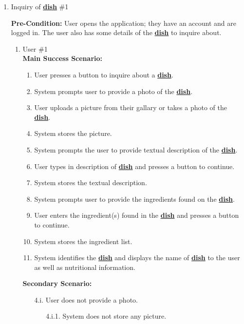 \documentclass[]{article}
\begin{document}
\begin{enumerate}[{\bf BE1.}]
	\item Inquiry of \hyperref[Dish]{\textbf{dish}} \#1
	
	\textbf{Pre-Condition:} User opens the application; they have an account and are logged in. The user also has some details of the \hyperref[Dish]{\textbf{dish}} to inquire about.
		\begin{enumerate}[{\bf VP1.}]
			\item User \#1 \\
				\textbf{Main Success Scenario:} 
				\begin{enumerate}[{1.}]
					\item User presses a button to inquire about a \hyperref[Dish]{\textbf{dish}}.
					\item System prompts user to provide a photo of the \hyperref[Dish]{\textbf{dish}}.
					\item User uploads a picture from their gallary or takes a photo of the \hyperref[Dish]{\textbf{dish}}.
					\item System stores the picture.
					\item System prompts the user to provide textual description of the \hyperref[Dish]{\textbf{dish}}.
					\item User types in description of \hyperref[Dish]{\textbf{dish}} and presses a button to continue.
					\item System stores the textual description.
					\item System prompts user to provide the ingredients found on the \hyperref[Dish]{\textbf{dish}}.
					\item User enters the ingredient(s) found in the \hyperref[Dish]{\textbf{dish}} and presses a button to continue.
					\item System stores the ingredient list.
					\item System identifies the \hyperref[Dish]{\textbf{dish}} and displays the name of \hyperref[Dish]{\textbf{dish}} to the user as well as nutritional information.
				\end{enumerate}
				\textbf{Secondary Scenario:}
				\begin{enumerate}
					\item[4.i.] User does not provide a photo.
					\begin{enumerate}
						\item[4.i.1.] System does not store any picture.
					\end{enumerate}

\end{enumerate}
\end{enumerate}
\end{enumerate}
\end{document}
